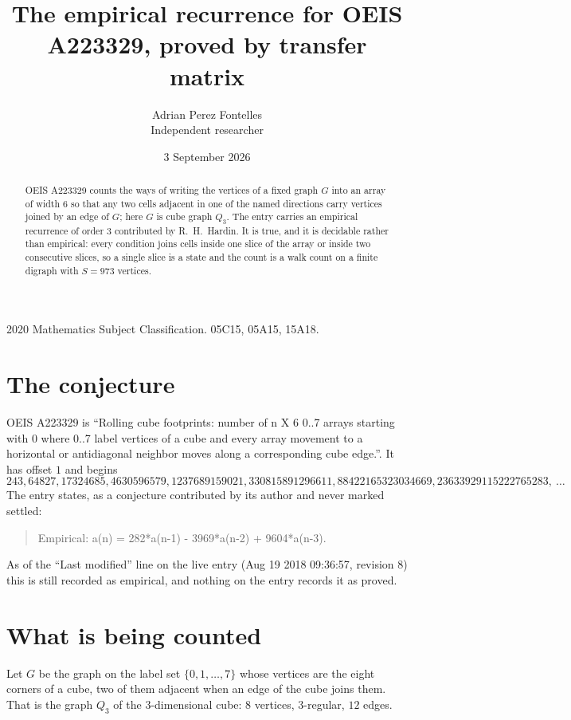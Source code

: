 \documentclass[11pt,a4paper]{article}
\title{The empirical recurrence for OEIS A223329, proved by transfer matrix}
\author{Adrian Perez Fontelles\\ \small Independent researcher}
\date{3 September 2026}
\theoremstyle{plain}
\theoremstyle{definition}
\begin{document}
\maketitle

\begin{abstract}
OEIS A223329 counts the ways of writing the vertices of a fixed graph $G$ into an array of width
$6$ so that any two cells adjacent in one of the named directions carry vertices joined by an
edge of $G$; here $G$ is cube graph $Q_3$. The entry carries an empirical recurrence of order $3$
contributed by R.~H.~Hardin. It is true, and it is decidable rather than empirical: every
condition joins cells inside one slice of the array or inside two consecutive slices, so a
single slice is a state and the count is a walk count on a finite digraph with $S=973$ vertices.
\end{abstract}

\noindent\small 2020 Mathematics Subject Classification. 05C15, 05A15, 15A18.\normalsize

\section{The conjecture}

OEIS A223329 is ``Rolling cube footprints: number of n X 6 0..7 arrays starting with 0 where 0..7 label vertices of a cube and every array movement to a horizontal or antidiagonal neighbor moves along a corresponding cube edge.''. It has offset $1$ and begins
\[
243, 64827, 17324685, 4630596579, 1237689159021, 330815891296611, 88422165323034669, 23633929115222765283,\ \dots
\]
The entry states, as a conjecture contributed by its author and never marked settled:
\begin{quote}
Empirical: a(n) = 282*a(n-1) - 3969*a(n-2) + 9604*a(n-3).
\end{quote}
As of the ``Last modified'' line on the live entry (Aug 19 2018 09:36:57, revision 8) this is still
recorded as empirical, and nothing on the entry records it as proved.

\section{What is being counted}

Let $G$ be the graph on the label set $\{0,1,\dots,7\}$ whose vertices are the eight corners of a cube, two of them adjacent when an edge of the cube joins them. That is the graph $Q_3$ of the $3$-dimensional cube: $8$ vertices, $3$-regular, $12$ edges.
\end{document}

